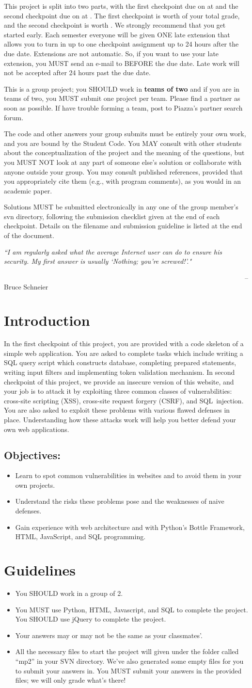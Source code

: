 \documentclass[letterpaper,12pt]{report}
\newcommand{\htitle}
{
     \noindent\parbox{\textwidth}
    {
        \course\hfill \distdate\newline
        \coursename\hfill 
        \settitle \vspace*{-.5ex}\newline
        \mbox{}\hrulefill\mbox{}
    }
    \vspace{8pt}
    \begin{center}{\Large\bf{\settitle}}\end{center}
}
\newcommand{\handout}
{
    \thispagestyle{empty}
    \markboth{}{}
    \pagestyle{plain}
    \htitle
}
\newcommand{\problemsetheader}
{
\setlength{\parindent}{0pt}

This project is split into two parts, with the first checkpoint due on {\bf \checkpointduedate} at {\bf \duetime} and the second checkpoint due on {\bf \duedate} at {\bf \duetime}. The first checkpoint is worth {\firstcheckpointpercent} of your total grade, and the second checkpoint is worth \secondcheckpointpercent.  We strongly recommend that you get started early. Each semester everyone will be given ONE late extension that allows you to turn in up to one checkpoint assignment up to 24 hours after the due date. Extensions are not automatic. So, if you want to use your late extension, you MUST send an e-mail to {\staffemail} BEFORE the due date. Late work will not be accepted after 24 hours past the due date. 
\medskip

This is a group project; you SHOULD work in \textbf{teams of two} and if you are in teams of two, you MUST submit one project per team.  Please find a partner as soon as possible.  If have trouble forming a team, post to Piazza's partner search forum.

\medskip

The code and other answers your group submits must be entirely your own work, and you are bound by the Student Code.  You MAY consult with other students about the conceptualization of the project and the meaning of the questions, but you MUST NOT look at any part of someone else's solution or collaborate with anyone outside your group.  You may consult published references, provided that you appropriately cite them (e.g., with program comments), as you would in an academic paper.

\medskip

Solutions MUST be submitted electronically in any one of the group member's svn directory, following the submission checklist given at the end of each checkpoint. Details on the filename and submission guideline is listed at the end of the document.

\medskip

\hrulefill

\medskip

}
\begin{document}
\handout
\problemsetheader

\medskip
\noindent
\emph{``I am regularly asked what the average Internet user can do to ensure his security. My first answer is
usually `Nothing; you're screwed!'."}

~~~~~~~~~~~~~~~~~~~~~~~~~~~~~~~~~~~~~~~~~~~~~~~~~~~~~~~~~~~~~~~~~~~~~~~-- Bruce Schneier 
\medskip
\pagebreak

\vspace{-6pt}
\section*{Introduction}
In the first checkpoint of this project, you are provided with a code skeleton of a simple web application. You are asked to complete tasks which include writing a SQL query script which constructs database, completing prepared statements, writing input filters and implementing token validation mechanism. In second checkpoint of this project, we provide an insecure version of this website, and your job is to attack it by exploiting three common classes of vulnerabilities: cross-site scripting (XSS), cross-site request forgery (CSRF), and SQL~injection. You are also asked to exploit these problems with various flawed defenses in place. Understanding how these attacks work will help you better defend your own web applications.\newline

\subsection*{Objectives:}

\begin{itemize}
\item Learn to spot common vulnerabilities in websites and to avoid them in your own projects.
\item Understand the risks these problems pose and the weaknesses of naive defenses.
\item Gain experience with web architecture and with Python's Bottle Framework, HTML, JavaScript, and SQL programming.
\end{itemize}

\section*{Guidelines}
\begin{itemize}
\item You SHOULD work in a group of 2.
\item You MUST use Python, HTML, Javascript, and SQL to complete the project. You SHOULD use jQuery to complete the project.
\item Your answers may or may not be the same as your classmates'.
\item All the necessary files to start the project will given under the folder called ``mp2'' in your SVN directory.
We've also generated some empty files for you to submit your answers in. You MUST submit your answers in the provided files; we will only grade what's there!
\end{itemize}
\end{document}

